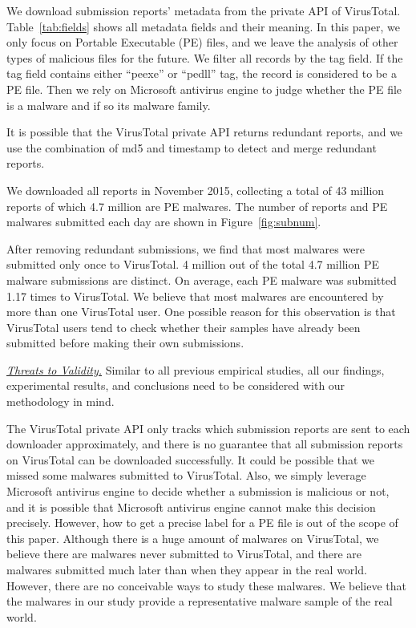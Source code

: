 We download submission reports' metadata from the private API of VirusTotal. 
Table~\ref{tab:fields} shows all metadata fields and their meaning. 
In this paper, we only focus on Portable Executable (PE) files, 
and we leave the analysis of other types of malicious files for the future. 
We filter all records by the tag field. If the tag field contains either ``peexe'' or ``pedll'' tag, the record is considered to be a PE file. 
Then we rely on Microsoft antivirus engine to judge whether the PE file is a malware and if so its malware family.

It is possible that the VirusTotal private API returns redundant reports, 
and we use the combination of md5 and timestamp
 to detect and merge redundant reports.

We downloaded all reports in November 2015, collecting a total of 43 million reports of which 4.7 million are PE malwares. 
The number of reports and PE malwares submitted each day are shown in Figure~\ref{fig:subnum}.

After removing redundant submissions, we find that most malwares were submitted only once to VirusTotal. 
4 million out of the total 4.7 million PE malware submissions are distinct. 
On average, each PE malware was submitted 1.17 times to VirusTotal. We believe that most malwares are encountered by more than one VirusTotal user. 
One possible reason for this observation is that VirusTotal users 
tend to check whether their samples have already been submitted
before making their own submissions.

\textit{\underline{Threats to Validity.}}
Similar to all previous empirical studies, all our findings, experimental results, 
and conclusions need to be considered with our methodology in mind. 

The VirusTotal private API only tracks which submission reports are sent to each downloader approximately, 
and there is no guarantee that all submission reports on VirusTotal can be downloaded successfully. 
It could be possible that we missed some malwares submitted to VirusTotal. 
Also, we simply leverage Microsoft antivirus engine to decide whether a submission is malicious or not, 
and it is possible that Microsoft antivirus engine cannot make this decision precisely. 
However, how to get a precise label for a PE file is out of the scope of this paper.  
Although there is a huge amount of malwares on VirusTotal, we believe there are malwares never submitted to VirusTotal, 
and there are malwares submitted much later than when they appear in the real world.
However, there are no conceivable ways to study these malwares. 
We believe that the malwares in our study provide a representative malware sample of the real world. 


